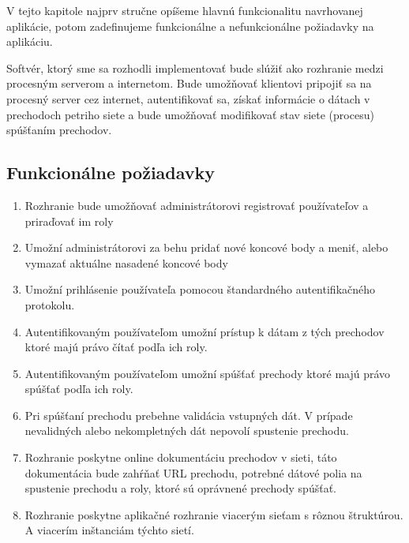 V tejto kapitole najprv stručne opíšeme hlavnú funkcionalitu navrhovanej aplikácie, potom zadefinujeme funkcionálne a nefunkcionálne požiadavky na aplikáciu.  

Softvér, ktorý sme sa rozhodli implementovať bude slúžiť ako rozhranie medzi procesným serverom a internetom. Bude umožňovať klientovi pripojiť sa na procesný server cez internet, autentifikovať sa, získať informácie o dátach v prechodoch petriho siete a bude umožňovať modifikovať stav siete (procesu) spúšťaním prechodov.  

\subsection{Funkcionálne požiadavky}  

\begin{enumerate}  
	\item Rozhranie bude umožňovať administrátorovi registrovať používateľov a priraďovať im roly  
	
	\item Umožní administrátorovi za behu pridať nové koncové body a meniť, alebo vymazať aktuálne nasadené koncové body  
		
	\item Umožní prihlásenie používateľa pomocou štandardného autentifikačného protokolu.  
	
	\item Autentifikovaným používateľom umožní prístup k dátam z tých prechodov ktoré majú právo čítať podľa ich roly.  
		
	\item Autentifikovaným používateľom umožní spúšťať prechody ktoré majú právo spúšťať podľa ich roly.  
		
	\item Pri spúšťaní prechodu prebehne validácia vstupných dát. V prípade nevalidných alebo nekompletných dát nepovolí spustenie prechodu.  
		
	\item Rozhranie poskytne online dokumentáciu prechodov v sieti, táto dokumentácia bude zahŕňať URL prechodu, potrebné dátové polia na spustenie prechodu a roly, ktoré sú oprávnené prechody spúšťať.  
		
	\item Rozhranie poskytne aplikačné rozhranie viacerým sieťam s rôznou štruktúrou. A viacerím inštanciám týchto sietí.  
	
\end{enumerate}      

